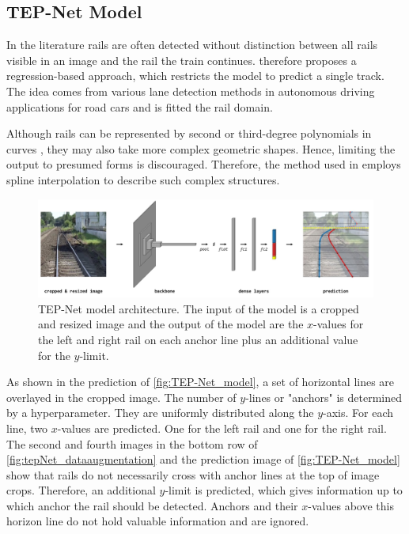 \subsection{TEP-Net Model}
\label{subsec:baselineModel}

In the literature rails are often detected without distinction between all rails visible in an image and the rail the train continues.
\cite{tepNet2024} therefore proposes a regression-based approach, which restricts the model to predict a single track.
The idea comes from various lane detection methods in autonomous driving applications for road cars and is fitted the rail domain.

Although rails can be represented by second or third-degree polynomials in curves \cite{PolyLaneNetRoad2021}, they may also take more complex geometric shapes.
Hence, limiting the output to presumed forms is discouraged.
Therefore, the method used in \cite{tepNet2024} employs spline interpolation to describe such complex structures.

\begin{figure}[H]
    \centering
    \includegraphics[width=\linewidth]{PICs/Baselinepaper/TEP-Net_model.jpg}
    \caption{\ac{TEP}-Net model architecture\cite{tepNet2024}. The input of the model is a cropped and resized image and the output of the model are the $x$-values for the left and right rail on each anchor line plus an additional value for the $y$-limit.}
    \label{fig:TEP-Net_model}
\end{figure}

As shown in the prediction of \autoref{fig:TEP-Net_model}, a set of horizontal lines are overlayed in the cropped image.
The number of $y$-lines or "anchors" is determined by a hyperparameter.
They are uniformly distributed along the $y$-axis. For each line, two $x$-values are predicted.
One for the left rail and one for the right rail.
The second and fourth images in the bottom row of \autoref{fig:tepNet_dataaugmentation} and the prediction image of \autoref{fig:TEP-Net_model} show that rails do not necessarily cross with anchor lines at the top of image crops.
Therefore, an additional $y$-limit is predicted, which gives information up to which anchor the rail should be detected.
Anchors and their $x$-values above this horizon line do not hold valuable information and are ignored.


